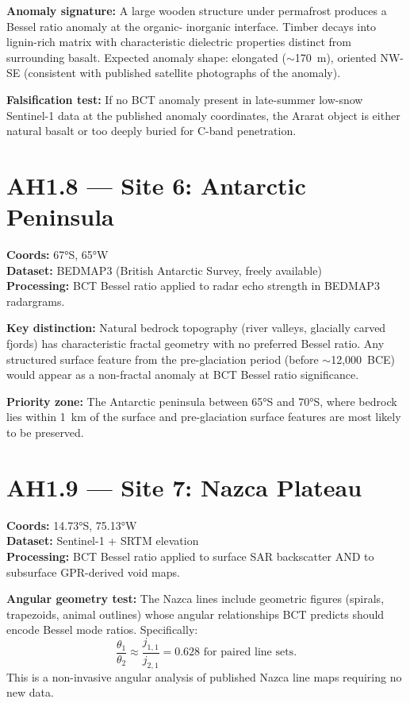 \documentclass[12pt,twocolumn]{article}
\begin{document}
\textbf{Anomaly signature:} A large wooden structure under
permafrost produces a Bessel ratio anomaly at the organic-
inorganic interface. Timber decays into lignin-rich matrix
with characteristic dielectric properties distinct from
surrounding basalt. Expected anomaly shape: elongated
($\sim$170~m), oriented NW-SE (consistent with published
satellite photographs of the anomaly).

\textbf{Falsification test:} If no BCT anomaly present
in late-summer low-snow Sentinel-1 data at the published
anomaly coordinates, the Ararat object is either natural
basalt or too deeply buried for C-band penetration.

\section{AH1.8 --- Site 6: Antarctic Peninsula}

\textbf{Coords:} 67°S, 65°W\\
\textbf{Dataset:} BEDMAP3 (British Antarctic Survey,
freely available)\\
\textbf{Processing:} BCT Bessel ratio applied to radar
echo strength in BEDMAP3 radargrams.

\textbf{Key distinction:} Natural bedrock topography
(river valleys, glacially carved fjords) has characteristic
fractal geometry with no preferred Bessel ratio. Any
structured surface feature from the pre-glaciation
period (before $\sim$12,000~BCE) would appear as a
non-fractal anomaly at BCT Bessel ratio significance.

\textbf{Priority zone:} The Antarctic peninsula between
65°S and 70°S, where bedrock lies within 1~km of the
surface and pre-glaciation surface features are most
likely to be preserved.

\section{AH1.9 --- Site 7: Nazca Plateau}

\textbf{Coords:} 14.73°S, 75.13°W\\
\textbf{Dataset:} Sentinel-1 + SRTM elevation\\
\textbf{Processing:} BCT Bessel ratio applied to surface
SAR backscatter AND to subsurface GPR-derived void maps.

\textbf{Angular geometry test:} The Nazca lines include
geometric figures (spirals, trapezoids, animal outlines)
whose angular relationships BCT predicts should encode
Bessel mode ratios. Specifically:
\begin{equation}
\frac{\theta_1}{\theta_2} \approx \frac{j_{1,1}}{j_{2,1}}
= 0.628 \text{ for paired line sets}.
\end{equation}
This is a non-invasive angular analysis of published
Nazca line maps requiring no new data.
\end{document}
